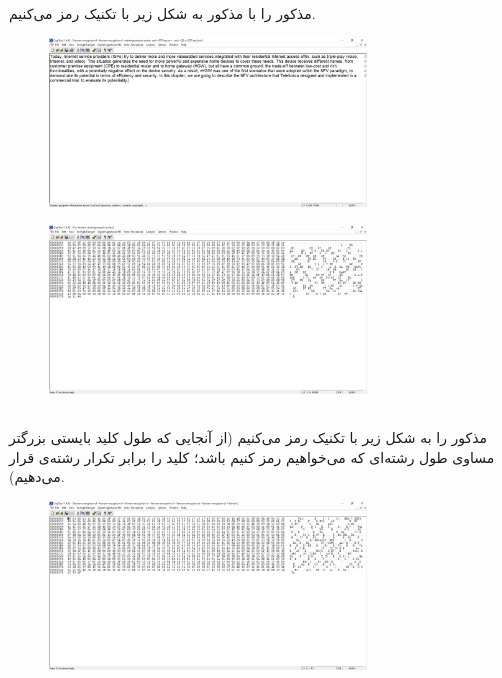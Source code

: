 \documentclass{article}
\begin{document}
\section{}%

\subsection{}
 مذکور را با  مذکور به شکل زیر با تکنیک  رمز می‌کنیم.
\begin{figure}[H]
    \centering
    \includegraphics[width=0.75\textwidth]{figures/5aa.jpg}
    \caption
	{}
    \label{fig:fig1}
\end{figure}
\begin{figure}[H]
    \centering
    \includegraphics[width=0.75\textwidth]{figures/5ab.jpg}
    \caption
	{}
    \label{fig:fig1}
\end{figure}

\subsection{}
 مذکور را به شکل زیر با تکنیک  رمز می‌کنیم (از آنجایی که طول کلید  بایستی بزرگتر مساوی طول رشته‌ای که می‌خواهیم رمز کنیم باشد؛ کلید  را برابر تکرار رشته‌ی  قرار می‌دهیم).
\begin{figure}[H]
    \centering
    \includegraphics[width=0.75\textwidth]{figures/5ba.jpg}
    \caption
	{}
    \label{fig:fig1}
\end{figure}
\end{document}
